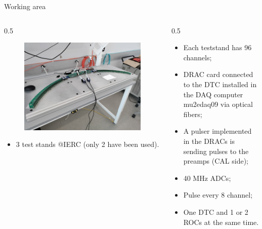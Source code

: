 \documentclass{beamer}[10pt]
\begin{document}
\begin{frame}{Working area}
    \begin{columns}
        \begin{column}{0.5\framewidth}
            \begin{figure}[H]
                \centering
                \includegraphics[width= \columnwidth]{figures/jpg/IMG_20240219_090538.jpg}
                \label{fig:enter-label}
            \end{figure}
\vspace{2mm}
            \begin{itemize}
            \item 3 test stands @IERC (only 2 have been used).
            \end{itemize}
        \end{column}
        \begin{column}{0.5\framewidth}
            \begin{itemize}
          \item Each teststand has 96 channels;  
\vspace{2mm}
           \item DRAC card connected to the DTC installed in the DAQ computer mu2edaq09 via optical fibers; 
\vspace{2mm}
            \item A pulser implemented in the DRACs is sending pulses to the preamps (CAL side);
\vspace{2mm}
            \item  40 MHz ADCs;
\vspace{2mm}
            \item Pulse every 8 channel;
\vspace{2mm}
 \item One DTC and 1 or 2 ROCs at the same time.
            \end{itemize}
        \end{column}
    \end{columns}
    \vspace{5mm}
\end{frame}
\end{document}
